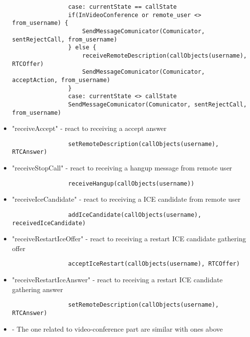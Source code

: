 \begin{itemize}
            \begin{lstlisting}
                case: currentState == callState
                if(InVideoConference or remote_user <> from_username) {
                    SendMessageComunicator(Comunicator, sentRejectCall, from_username)
                } else {
                    receiveRemoteDescription(callObjects(username), RTCOffer)
                    SendMessageComunicator(Comunicator, acceptAction, from_username)
                }
                case: currentState <> callState
                SendMessageComunicator(Comunicator, sentRejectCall, from_username)
            \end{lstlisting}
            \item "receiveAccept" - react to receiving a accept answer
            \begin{lstlisting}
                setRemoteDescription(callObjects(username), RTCAnswer)
            \end{lstlisting}
            \item "receiveStopCall" - react to receiving a hangup message from remote user
            \begin{lstlisting}
                receiveHangup(callObjects(username))
            \end{lstlisting}
            \item "receiveIceCandidate" - react to receiving a ICE candidate from remote user
            \begin{lstlisting}
                addIceCandidate(callObjects(username), receivedIceCandidate)
            \end{lstlisting}
            \item "receiveRestartIceOffer" - react to receiving a restart ICE candidate gathering offer
            \begin{lstlisting}
                acceptIceRestart(callObjects(username), RTCOffer)
            \end{lstlisting}
            \item "receiveRestartIceAnswer" - react to receiving a restart ICE candidate gathering answer
            \begin{lstlisting}
                setRemoteDescription(callObjects(username), RTCAnswer)
            \end{lstlisting}
            \item - The one related to video-conference part are similar with ones above

\end{itemize}
